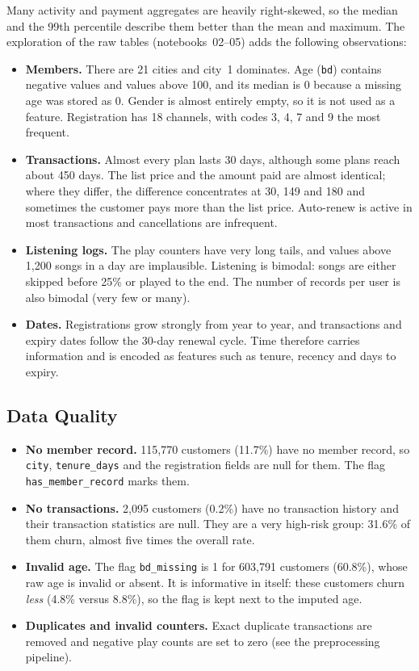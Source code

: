 \documentclass{article}
\begin{document}
Many activity and payment aggregates are heavily right-skewed, so the median and the 99th percentile describe them better than the mean and maximum. The exploration of the raw tables (notebooks~02--05) adds the following observations:

\begin{itemize}
    \item \textbf{Members.} There are 21 cities and city~1 dominates. Age (\texttt{bd}) contains negative values and values above 100, and its median is 0 because a missing age was stored as 0. Gender is almost entirely empty, so it is not used as a feature. Registration has 18 channels, with codes 3, 4, 7 and 9 the most frequent.
    \item \textbf{Transactions.} Almost every plan lasts 30 days, although some plans reach about 450 days. The list price and the amount paid are almost identical; where they differ, the difference concentrates at 30, 149 and 180 and sometimes the customer pays more than the list price. Auto-renew is active in most transactions and cancellations are infrequent.
    \item \textbf{Listening logs.} The play counters have very long tails, and values above 1{,}200 songs in a day are implausible. Listening is bimodal: songs are either skipped before 25\% or played to the end. The number of records per user is also bimodal (very few or many).
    \item \textbf{Dates.} Registrations grow strongly from year to year, and transactions and expiry dates follow the 30-day renewal cycle. Time therefore carries information and is encoded as features such as tenure, recency and days to expiry.
\end{itemize}

\subsection{Data Quality}

\begin{itemize}
    \item \textbf{No member record.} 115{,}770 customers (11.7\%) have no member record, so \texttt{city}, \texttt{tenure\_days} and the registration fields are null for them. The flag \texttt{has\_member\_record} marks them.
    \item \textbf{No transactions.} 2{,}095 customers (0.2\%) have no transaction history and their transaction statistics are null. They are a very high-risk group: 31.6\% of them churn, almost five times the overall rate.
    \item \textbf{Invalid age.} The flag \texttt{bd\_missing} is 1 for 603{,}791 customers (60.8\%), whose raw age is invalid or absent. It is informative in itself: these customers churn \emph{less} (4.8\% versus 8.8\%), so the flag is kept next to the imputed age.
    \item \textbf{Duplicates and invalid counters.} Exact duplicate transactions are removed and negative play counts are set to zero (see the preprocessing pipeline).
\end{itemize}
\end{document}

